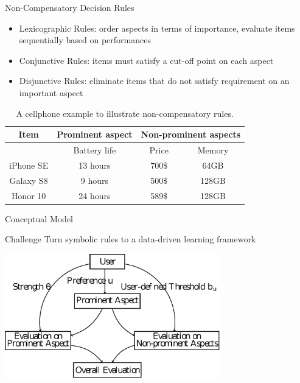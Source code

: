 \documentclass[xcolor=dvipsnames]{beamer}
\begin{document}
\begin{frame}{Non-Compensatory Decision Rules}
\begin{itemize}
    \item Lexicographic Rules: order aspects in terms of importance, evaluate items sequentially based on performances  
    \item Conjunctive Rules: items must satisfy a cut-off point on each aspect
    \item Disjunctive Rules: eliminate items that do not satisfy requirement on an important aspect
\end{itemize}
    \begin{table}[htp]
\caption{A cellphone example to illustrate non-compensatory rules.}
\small
\centering
\begin{tabular}{|c|c|c|c|}
\hline
Item & Prominent aspect & \multicolumn{2}{|c|}{Non-prominent aspects}\\\hline
& Battery life &  Price & Memory \\\hline
iPhone SE &  13 hours & 700$\$$ & 64GB  \\\hline
Galaxy S8 & 9 hours& 500$\$$  & 128GB \\\hline
Honor 10 & 24 hours& 589$\$$ & 128GB \\\hline
\end{tabular}
\label{tab:example}
\end{table}
\end{frame}

\begin{frame}{Conceptual Model}
    \begin{block}{Challenge}
    Turn symbolic rules to a data-driven learning framework 
    \end{block}
\centering
\includegraphics[width=0.7\textwidth]{conceptualmodel.eps}
\end{frame}
\end{document}
